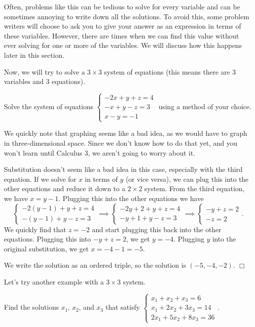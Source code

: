 \documentclass[lang=en,11pt]{elegantbook}
\begin{document}
Often, problems like this can be tedious to solve for every variable and can be sometimes annoying to write down all the solutions.  To avoid this, some problem writers will choose to ask you to give your answer as an expression in terms of these variables.  However, there are times when we can find this value without ever solving for one or more of the variables.  We will discuss how this happens later in this section.

Now, we will try to solve a $3\times 3$ system of equations (this means there are $3$ variables and $3$ equations).
\begin{example}
Solve the system of equations $\begin{cases} -2x+y+z=4 \\ -x+y-z=3 \\ x-y=-1 \end{cases}$ using a method of your choice.
\end{example}
\begin{solution}
We quickly note that graphing seems like a bad idea, as we would have to graph in three-dimensional space.  Since we don't know how to do that yet, and you won't learn until Calculus 3, we aren't going to worry about it.

Substitution doesn't seem like a bad idea in this case, especially with the third equation.  If we solve for $x$ in terms of $y$ (or vice versa), we can plug this into the other equations and reduce it down to a $2\times 2$ system.  From the third equation, we have $x=y-1$.  Plugging this into the other equations we have $$\begin{cases} -2(y-1)+y+z=4 \\ -(y-1)+y-z=3 \end{cases} \implies \begin{cases} -2y+2+y+z=4 \\ -y+1+y-z=3 \end{cases} \implies \begin{cases} -y+z=2 \\ -z=2 \end{cases}.$$  We quickly find that $z=-2$ and start plugging this back into the other equations.  Plugging this into $-y+z=2$, we get $y=-4$.  Plugging $y$ into the original substitution, we get $x=-4-1=-5$.

We write the solution as an ordered triple, so the solution is $(-5,-4,-2)$.  $\Box$
\end{solution}
Let's try another example with a $3\times 3$ system.
\begin{example}
Find the solutions $x_1$, $x_2$, and $x_3$ that satisfy $\begin{cases} x_1+x_2+x_3=6 \\ x_1+2x_2+3x_3=14 \\ 2x_1+5x_2+8x_3=36 \end{cases}$.
\end{example}
\end{document}
